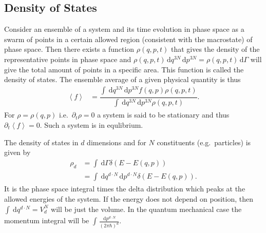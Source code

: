 \documentclass[a4paper,10pt]{article}
\newcommand{\td}{\,\text{d}}
\numberwithin{equation}{section}
\begin{document}
\begin{multicols}{2}
\section{Density of States}
Consider an ensemble of a system and its time evolution in phase space as a swarm of points in a certain allowed region (consistent with the macrostate) of phase space.
Then there exists a function $\rho \left(q,p,t\right)$ that gives the density of the representative points in phase space and $\rho \left(q,p,t\right)\td q ^{3N}\td p ^{3N}=\rho (q,p,t)\td \Gamma $ will give the total amount of points in a specific area.
This function is called the density of states.
The ensemble average of a given physical quantity is thus
\begin{align} 
  \left\langle f \right\rangle  &= \dfrac{\int_{}^{}\td q ^{3N}\td p ^{3N}f\left(q,p\right)\rho \left(q,p,t\right)}{\int_{}^{}\td q ^{3N}\td p ^{3N}\rho (q,p,t)}
.\end{align} 
For $\rho =\rho (q,p)$ i.e.\ $\partial_t \rho =0$ a system is said to be stationary and thus $\partial_t\left\langle f \right\rangle =0$.
Such a system is in equlibrium.

The density of states in $d$ dimensions and for $N$ constituents (e.g.\ particles) is given by
\begin{align} 
  \rho _d &= \int_{}^{}\td \Gamma \delta \left(E-E(q,p)\right)\\
        &= \int_{}^{}\td q ^{d\cdot N}\td p ^{d\cdot N}\delta (E-E(q,p))
.\end{align} 
It is the phase space integral times the delta distribution which peaks at the allowed energies of the system.
If the energy does not depend on position, then $\int_{}^{}\td q ^{d\cdot N}=V_d^N$ will be just the volume.
In the quantum mechanical case the momentum integral will be $\int_{}^{}\tfrac{\td p ^{d\cdot N}}{(2\pi \hbar )^d}$.


\end{multicols}
\end{document}
